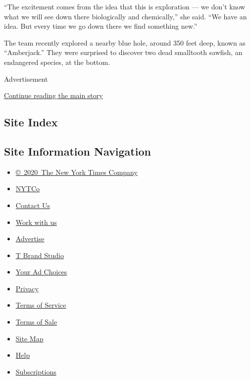 ``The excitement comes from the idea that this is exploration --- we
don't know what we will see down there biologically and chemically,''
she said. ``We have an idea. But every time we go down there we find
something new.''

The team recently explored a nearby blue hole, around 350 feet deep,
known as ``Amberjack.'' They were surprised to discover two dead
smalltooth sawfish, an endangered species, at the bottom.

Advertisement

\protect\hyperlink{after-bottom}{Continue reading the main story}

\hypertarget{site-index}{%
\subsection{Site Index}\label{site-index}}

\hypertarget{site-information-navigation}{%
\subsection{Site Information
Navigation}\label{site-information-navigation}}

\begin{itemize}
\tightlist
\item
  \href{https://help.nytimes3xbfgragh.onion/hc/en-us/articles/115014792127-Copyright-notice}{©~2020~The
  New York Times Company}
\end{itemize}

\begin{itemize}
\tightlist
\item
  \href{https://www.nytco.com/}{NYTCo}
\item
  \href{https://help.nytimes3xbfgragh.onion/hc/en-us/articles/115015385887-Contact-Us}{Contact
  Us}
\item
  \href{https://www.nytco.com/careers/}{Work with us}
\item
  \href{https://nytmediakit.com/}{Advertise}
\item
  \href{http://www.tbrandstudio.com/}{T Brand Studio}
\item
  \href{https://www.nytimes3xbfgragh.onion/privacy/cookie-policy\#how-do-i-manage-trackers}{Your
  Ad Choices}
\item
  \href{https://www.nytimes3xbfgragh.onion/privacy}{Privacy}
\item
  \href{https://help.nytimes3xbfgragh.onion/hc/en-us/articles/115014893428-Terms-of-service}{Terms
  of Service}
\item
  \href{https://help.nytimes3xbfgragh.onion/hc/en-us/articles/115014893968-Terms-of-sale}{Terms
  of Sale}
\item
  \href{https://spiderbites.nytimes3xbfgragh.onion}{Site Map}
\item
  \href{https://help.nytimes3xbfgragh.onion/hc/en-us}{Help}
\item
  \href{https://www.nytimes3xbfgragh.onion/subscription?campaignId=37WXW}{Subscriptions}
\end{itemize}

